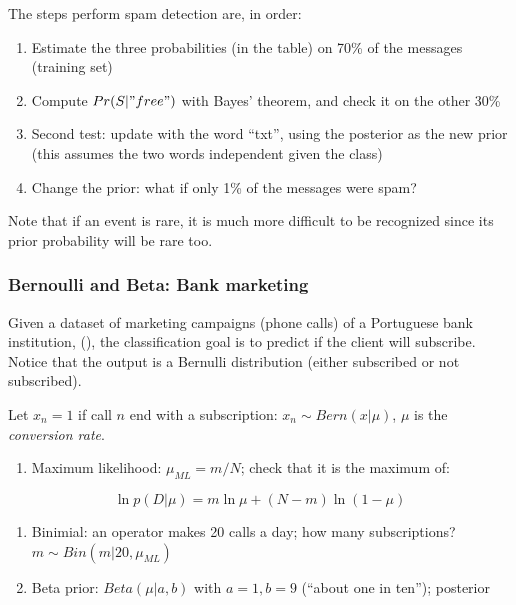 \documentclass{article}
\begin{document}
The steps perform spam detection are, in order:

\begin{enumerate}
\def\labelenumi{\arabic{enumi}.}
\item
  Estimate the three probabilities (in the table) on 70\% of the
  messages (training set)
\item
  Compute \(Pr(S | "free")\) with Bayes' theorem, and check it on the
  other 30\%
\item
  Second test: update with the word ``txt'', using the posterior as the
  new prior (this assumes the two words independent given the class)
\item
  Change the prior: what if only 1\% of the messages were spam?
\end{enumerate}

Note that if an event is rare, it is much more difficult to be
recognized since its prior probability will be rare too.

\subsubsection{Bernoulli and Beta: Bank
marketing}\label{bernoulli-and-beta-bank-marketing}

Given a dataset of marketing campaigns (phone calls) of a Portuguese
bank institution, (), the
classification goal is to predict if the client will subscribe. Notice
that the output is a Bernulli distribution (either subscribed or not
subscribed).

Let \(x_n = 1\) if call \(n\) end with a subscription:
\(x_n \sim Bern(x | \mu )\), \(\mu\) is the \emph{conversion rate}.

\begin{enumerate}
\def\labelenumi{\arabic{enumi}.}
\tightlist
\item
  Maximum likelihood: \(\mu_{ML} = m / N\); check that it is the maximum
  of:
\end{enumerate}

\[\ln p(D | \mu ) = m \ln \mu + (N - m) \ln (1 - \mu )\]

\begin{enumerate}
\def\labelenumi{\arabic{enumi}.}
\setcounter{enumi}{1}
\item
  Binimial: an operator makes 20 calls a day; how many subscriptions?
  \(m \sim
  Bin(m | 20, \mu_{ML})\)
\item
  Beta prior: \(Beta(\mu | a, b)\) with \(a = 1, b = 9\) (``about one in
  ten''); posterior
\end{enumerate}
\end{document}

